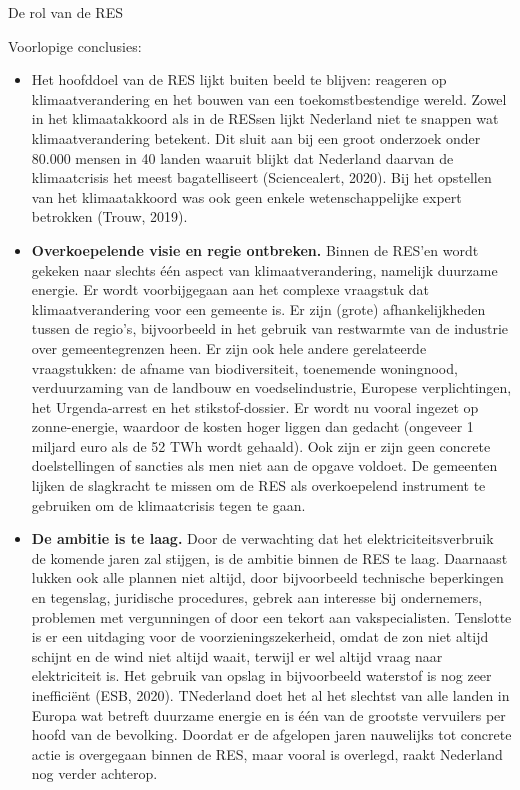 \begin{voorstel}{De rol van de RES}
\begin{uitdaging}
Voorlopige conclusies:
\begin{itemize}
	\item Het hoofddoel van de RES lijkt buiten beeld te blijven: reageren op klimaatverandering en het bouwen van een toekomstbestendige wereld. Zowel in het klimaatakkoord als in de RESsen lijkt Nederland niet te snappen wat klimaatverandering betekent. Dit sluit aan bij een groot onderzoek onder 80.000 mensen in 40 landen waaruit blijkt dat Nederland daarvan de klimaatcrisis het meest bagatelliseert (Sciencealert, 2020). Bij het opstellen van het klimaatakkoord was ook geen enkele wetenschappelijke expert betrokken (Trouw, 2019).
	\item \textbf{Overkoepelende visie en regie ontbreken.} Binnen de RES’en wordt gekeken naar slechts één aspect van klimaatverandering, namelijk duurzame energie. Er wordt voorbijgegaan aan het complexe vraagstuk dat klimaatverandering voor een gemeente is. Er zijn (grote) afhankelijkheden tussen de regio’s, bijvoorbeeld in het gebruik van restwarmte van de industrie over gemeentegrenzen heen. Er zijn ook hele andere gerelateerde vraagstukken: de afname van biodiversiteit, toenemende woningnood, verduurzaming van de landbouw en voedselindustrie, Europese verplichtingen, het Urgenda-arrest en het stikstof-dossier. Er wordt nu vooral ingezet op zonne-energie, waardoor de kosten hoger liggen dan gedacht (ongeveer 1 miljard euro als de 52 TWh wordt gehaald). Ook zijn er zijn geen concrete doelstellingen of sancties als men niet aan de opgave voldoet. De gemeenten lijken de slagkracht te missen om de RES als overkoepelend instrument te gebruiken om de klimaatcrisis tegen te gaan.
	\item \textbf{De ambitie is te laag.} Door de verwachting dat het elektriciteitsverbruik de komende jaren zal stijgen, is de ambitie binnen de RES te laag. Daarnaast lukken ook alle plannen niet altijd, door bijvoorbeeld technische beperkingen en tegenslag, juridische procedures, gebrek aan interesse bij ondernemers, problemen met vergunningen of door een tekort aan vakspecialisten. Tenslotte is er een uitdaging voor de voorzieningszekerheid, omdat de zon niet altijd schijnt en de wind niet altijd waait, terwijl er wel altijd vraag naar elektriciteit is. Het gebruik van opslag in bijvoorbeeld waterstof is nog zeer inefficiënt (ESB, 2020). TNederland doet het al het slechtst van alle landen in Europa wat betreft duurzame energie en is één van de grootste vervuilers per hoofd van de bevolking. Doordat er de afgelopen jaren nauwelijks tot concrete actie is overgegaan binnen de RES, maar vooral is overlegd, raakt Nederland nog verder achterop.

\end{itemize}
\end{uitdaging}
\end{voorstel}
